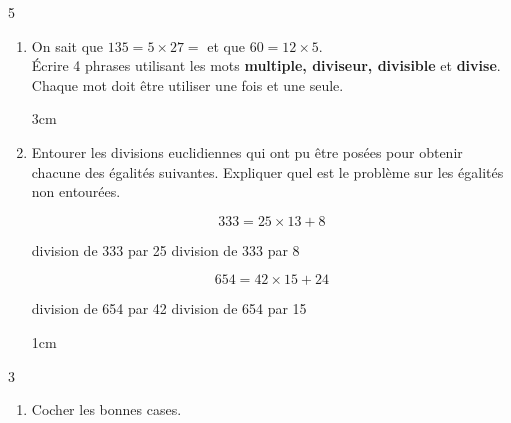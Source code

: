 \documentclass[a4paper]{book}
\begin{document}
{\begin{exerciceNote}{5}
\begin{enumerate}[leftmargin=*]
\begin{itemize}
                \medskip
                
                \item Un nombre entier est divisible par 3 si \dotfill

                \medskip

                \dotfill
            \end{itemize}

            \item On sait que $135=5\times27=$ et que $60=12\times5$. \\
            Écrire 4 phrases utilisant les mots \textbf{multiple, diviseur, divisible} et \textbf{divise}. Chaque mot doit être utiliser une fois et une seule.

            \begin{ZoneReponse}{3cm}
            \end{ZoneReponse}

            \item Entourer les divisions euclidiennes qui ont pu être posées pour obtenir chacune des égalités suivantes. Expliquer quel est le problème sur les égalités non entourées.

            \begin{minipage}{0.45\linewidth}
                \[333=25\times13+8\]

                \begin{center}
                    division de 333 par 25 \quad \quad division de 333 par 8
                \end{center}
            \end{minipage}
            \hfill \vline \hfill
            \begin{minipage}{0.45\linewidth}
                \[654=42\times15+24\]

                division de 654 par 42 \quad \quad division de 654 par 15
            \end{minipage} 

            \begin{ZoneReponse}{1cm}
            \end{ZoneReponse}
        \end{enumerate}
    \end{exerciceNote}


\newpage


    \begin{exerciceNote}{3}
        \begin{enumerate}[leftmargin=*]
            \item Cocher les bonnes cases.
            

\end{enumerate}
\end{exerciceNote}}
\end{document}
